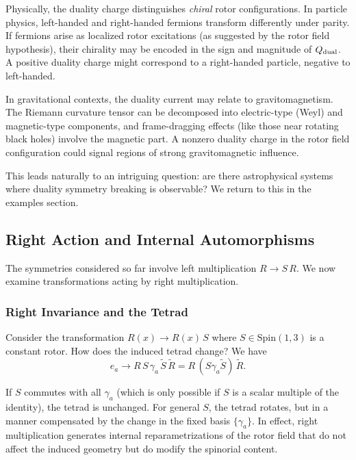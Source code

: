 \documentclass[11pt,a4paper]{article}
\numberwithin{equation}{section}
\theoremstyle{plain}
\theoremstyle{definition}
\theoremstyle{remark}
\begin{document}
Physically, the duality charge distinguishes \emph{chiral} rotor configurations. In particle physics, left-handed and right-handed fermions transform differently under parity. If fermions arise as localized rotor excitations (as suggested by the rotor field hypothesis), their chirality may be encoded in the sign and magnitude of $Q_{\rm dual}$. A positive duality charge might correspond to a right-handed particle, negative to left-handed.

In gravitational contexts, the duality current may relate to gravitomagnetism. The Riemann curvature tensor can be decomposed into electric-type (Weyl) and magnetic-type components, and frame-dragging effects (like those near rotating black holes) involve the magnetic part. A nonzero duality charge in the rotor field configuration could signal regions of strong gravitomagnetic influence.

This leads naturally to an intriguing question: are there astrophysical systems where duality symmetry breaking is observable? We return to this in the examples section.

\subsection{Right Action and Internal Automorphisms}

The symmetries considered so far involve left multiplication $R \to S\,R$. We now examine transformations acting by right multiplication.

\subsubsection{Right Invariance and the Tetrad}

Consider the transformation $R(x) \to R(x)\,S$ where $S \in \mathrm{Spin}(1,3)$ is a constant rotor. How does the induced tetrad change? We have
\begin{equation}
e_a \to R\,S\,\gamma_a\,\widetilde{S}\,\widetilde{R} = R\,(S\gamma_a\widetilde{S})\,\widetilde{R}.
\end{equation}

If $S$ commutes with all $\gamma_a$ (which is only possible if $S$ is a scalar multiple of the identity), the tetrad is unchanged. For general $S$, the tetrad rotates, but in a manner compensated by the change in the fixed basis $\{\gamma_a\}$. In effect, right multiplication generates internal reparametrizations of the rotor field that do not affect the induced geometry but do modify the spinorial content.
\end{document}
